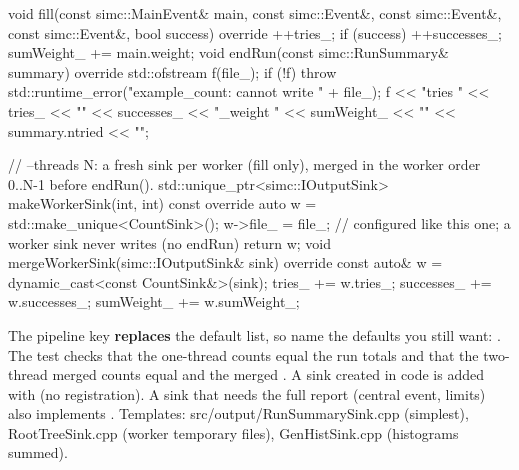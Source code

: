 \begin{simccode}[basicstyle=\ttfamily\tiny,style=simccpp]
    void fill(const simc::MainEvent& main, const simc::Event&, const simc::Event&, const simc::Event&,
              bool success) override {
        ++tries_;
        if (success) {
            ++successes_;
            sumWeight_ += main.weight;
        }
    }
    void endRun(const simc::RunSummary& summary) override {
        std::ofstream f(file_);
        if (!f) throw std::runtime_error("example_count: cannot write " + file_);
        f << "tries " << tries_ << "\nsuccesses " << successes_ << "\nsum_weight " << sumWeight_ << "\nntried "
          << summary.ntried << "\n";
    }

    // --threads N: a fresh sink per worker (fill only), merged in the worker order 0..N-1 before endRun().
    std::unique_ptr<simc::IOutputSink> makeWorkerSink(int, int) const override {
        auto w = std::make_unique<CountSink>();
        w->file_ = file_;   // configured like this one; a worker sink never writes (no endRun)
        return w;
    }
    void mergeWorkerSink(simc::IOutputSink& sink) override {
        const auto& w = dynamic_cast<const CountSink&>(sink);
        tries_ += w.tries_;
        successes_ += w.successes_;
        sumWeight_ += w.sumWeight_;
    }
\end{simccode}
The pipeline key  \textbf{replaces} the default list, so name the defaults you still want:
. The test checks that the one-thread counts equal
the run totals and that the two-thread merged counts equal  and the merged . A sink created in code is added
with  (no registration). A sink that needs the full report (central event,
limits) also implements . Templates: src/\allowbreak{}output/\allowbreak{}RunSummarySink.\allowbreak{}cpp (simplest),
RootTreeSink.\allowbreak{}cpp (worker temporary files), GenHistSink.\allowbreak{}cpp (histograms summed).

